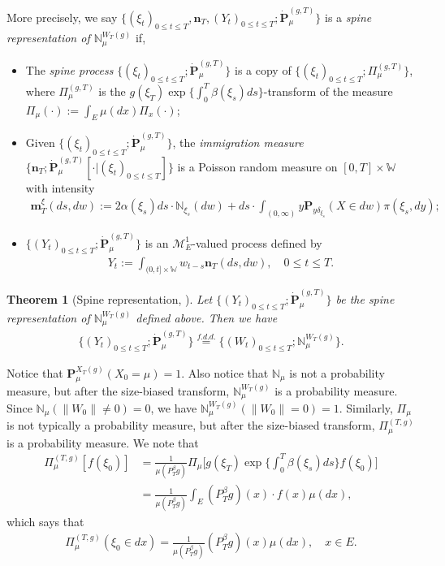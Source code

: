 \documentclass[12pt,a4paper]{amsart}
\newtheorem{thm}{Theorem}[section]
\theoremstyle{definition}
\numberwithin{equation}{section}
\begin{document}
More precisely,
we say $\{(\xi_t)_{0\leq t\leq T}, \mathbf n_T,  (Y_t)_{ 0\leq t\leq T}; \dot {\mathbf P}^{(g,T)}_\mu\}$ is a \emph{spine representation of $\mathbb N^{W_T(g)}_\mu$}  if,
\begin{itemize}
\item
	The \emph{spine process} $\{(\xi_t)_{0\leq t\leq T}; \dot{\mathbf P}^{(g,T)}_\mu\}$ is a copy of $\{(\xi_t)_{0\leq t\leq T}; \Pi^{(g,T)}_{\mu}\}$, where $\Pi^{(g,T)}_{\mu}$ is the $g(\xi_T) \exp\{\int_0^T \beta(\xi_s)ds\}$-transform of the measure $\Pi_{\mu}(\cdot):=\int_{E}\mu(dx)\Pi_x(\cdot) $;
\item
	Given $\{(\xi_t)_{0\leq t\leq T}; \dot{\mathbf P}^{(g,T)}_\mu\}$, the \emph{immigration measure} $\{\mathbf n_T; \dot{\mathbf P}^{(g,T)}_\mu[\cdot |(\xi_t)_{0\leq t\leq T}]\}$ is a Poisson random measure on $[0,T] \times \mathbb W$ with intensity
  \begin{align}
    \mathbf m^\xi_T(ds,dw)
    := 2 \alpha(\xi_s) ds \cdot \mathbb N_{\xi_s}(dw) + ds \cdot \int_{(0,\infty)} y \mathbf P_{y\delta_{\xi_s}}(X\in dw) \pi(\xi_s,dy);
  \end{align}
\item
	$\{(Y_t)_{0\leq t\leq T}; \dot{\mathbf P}^{(g,T)}_\mu\}$ is an $\mathcal M^1_E$-valued process defined by
  \begin{align}
    Y_t
    := \int_{(0,t] \times \mathbb W} w_{t-s} \mathbf n_T(ds,dw),
    \quad 0 \leq t\leq T.
  \end{align}
\end{itemize}
\begin{thm}[Spine representation, \cite{RenSongSun2017Spine}]\label{thm: spine representation}
	Let $\{(Y_t)_{0\leq t\leq T}; \dot {\mathbf P}^{(g,T)}_\mu\}$ be the spine representation of $\mathbb N^{W_T(g)}_\mu$ defined above.
	Then we have
  \begin{align}
    \{(Y_t)_{0\leq t\leq T}; \dot{\mathbf P}^{(g,T)}_\mu\}
    \overset{f.d.d.}{=} \{(W_t)_{0\leq t\leq T}; \mathbb N_\mu^{W_T(g)}\}.
  \end{align}
\end{thm}

Notice that $\mathbf P^{X_T(g)}_\mu(X_0 = \mu) = 1$.
Also notice that $\mathbb N_\mu$ is not a probability measure, 
but after the size-biased transform, 
$\mathbb N^{W_T(g)}_\mu$ is a probability measure.
Since $\mathbb N_{\mu}(\|W_0\|\neq 0) = 0$, we have $\mathbb N_\mu^{W_T(g)}(\|W_0\|= 0) = 1$.
Similarly, $\Pi_{\mu}$ is not typically a probability measure, 
but after the size-biased transform, 
$\Pi_{\mu}^{(T,g)}$ is a probability measure.
We note that
\begin{align}
	\Pi_{\mu}^{(T,g)} [ f(\xi_0) ]
	&= \frac{1}{\mu(P^\beta_Tg)}\Pi_{\mu}\Big[g(\xi_T)
   \exp\Big\{\int_0^T \beta(\xi_s)ds \Big\} f(\xi_0) \Big]
	\\&= \frac{1}{\mu(P^\beta_T g)}
	\int_E (P^\beta_T g)(x) \cdot f(x)\mu(dx),
\end{align}
which says that
\begin{align}\label{eq: initial distribution of spine}
	\Pi_{\mu}^{(T,g)} (\xi_0 \in dx)
	= \frac{1}{\mu(P^\beta_T g)} (P^\beta_T g)(x)\mu(dx),
	\quad x\in E.
\end{align}
\end{document}
